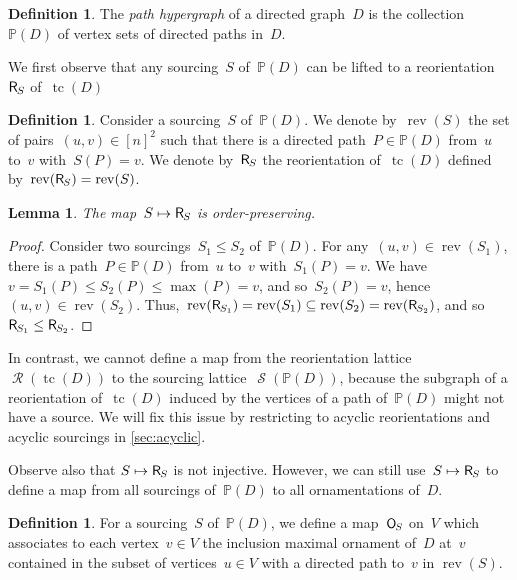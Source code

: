 \documentclass{amsart}
\newtheorem{lemma}[theorem]{Lemma}
\theoremstyle{definition}
\newtheorem{definition}[theorem]{Definition}
\renewcommand{\c}[1]{\mathcal{#1}} %
\DeclareMathOperator{\tc}{tc} %
\newcommand{\darkblue}{\color{darkblue}} %
\newcommand{\defn}[1]{\textsl{\darkblue #1}} %
\newcommand{\mymap}[2]{\mathsf{#1}_{\hspace{-.7pt}#2}}
\newcommand{\orn}[1]{\mymap{O}{#1}}  %
\DeclareMathOperator{\Reori}{\c{R}}  %
\newcommand{\reori}[1]{\mymap{R}{#1}}  %
\DeclareMathOperator{\rev}{rev} %
\DeclareMathOperator{\Sour}{\mathcal{S}}  %
\newcommand{\PP}{\mathbb P} %
\begin{document}
\begin{definition}
\label{def:pathHypergraph}
The \defn{path hypergraph} of a directed graph~$D$ is the collection~$\PP(D)$ of vertex sets of directed paths in~$D$.
\end{definition}

We first observe that any sourcing~$S$ of~$\PP(D)$ can be lifted to a reorientation~$\reori{S}$ of~$\tc(D)$

\begin{definition}
\label{def:Sour2Reori}
Consider a sourcing~$S$ of~$\PP(D)$.
We denote by~$\rev(S)$ the set of pairs~$(u,v) \in [n]^2$ such that there is a directed path~$P \in \PP(D)$ from~$u$ to~$v$ with~$S(P) = v$.
We denote by~$\reori{S}$ the reorientation of~$\tc(D)$ defined by~$\rev(\reori{S}) = \rev(S)$.
\end{definition}

\begin{lemma}
\label{lem:Sour2Reori}
The map~$S \mapsto \reori{S}$ is order-preserving.
\end{lemma}

\begin{proof}
Consider two sourcings~$S_1 \le S_2$ of~$\PP(D)$.
For any~$(u,v) \in \rev(S_1)$, there is a path~$P \in \PP(D)$ from~$u$ to~$v$ with~$S_1(P) = v$.
We have~$v = S_1(P) \le S_2(P) \le \max(P) = v$, and so~$S_2(P) = v$, hence~$(u,v) \in \rev(S_2)$.
Thus,~$\rev(\reori{S_1}) = \rev(S_1) \subseteq \rev(S_2) = \rev(\reori{S_2})$, and so~${\reori{S_1} \le \reori{S_2}}$.
\end{proof}

In contrast, we cannot define a map from the reorientation lattice~$\Reori(\tc(D))$ to the sourcing lattice~$\Sour(\PP(D))$, because the subgraph of a reorientation of~$\tc(D)$ induced by the vertices of a path of~$\PP(D)$ might not have a source.
We will fix this issue by restricting to acyclic reorientations and acyclic sourcings in \cref{sec:acyclic}.

Observe also that $S \mapsto \reori{S}$ is not injective.
However, we can still use~$S \mapsto \reori{S}$ to define a map from all sourcings of~$\PP(D)$ to all ornamentations of~$D$.

\begin{definition}
\label{def:Sour2Orn}
For a sourcing~$S$ of~$\PP(D)$, we define a map~$\orn{S}$ on~$V$ which associates to each vertex~$v \in V$ the inclusion maximal ornament of~$D$ at~$v$ contained in the subset of vertices~$u \in V$ with a directed path to~$v$ in $\rev(S)$.
\end{definition}
\end{document}
